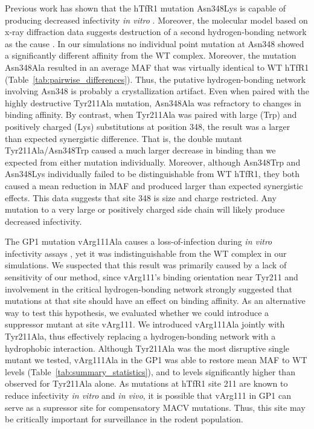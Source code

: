 \documentclass[12pt]{article}
\begin{document}
Previous work has shown that the hTfR1 mutation Asn348Lys is capable of producing decreased infectivity \emph{in vitro} \citep{Rad2008,Rad20111}. Moreover, the molecular model based on x-ray diffraction data suggests destruction of a second hydrogen-bonding network as the cause \citep{Abraham2010}. In our simulations no individual point mutation at Asn348 showed a significantly different affinity from the WT complex. Moreover, the mutation Asn348Ala resulted in an average MAF that was virtually identical to WT hTfR1 (Table~\ref{tab:pairwise_differences}). Thus, the putative hydrogen-bonding network involving Asn348 is probably a crystallization artifact. Even when paired with the highly destructive Tyr211Ala mutation, Asn348Ala was refractory to changes in binding affinity. By contrast, when Tyr211Ala was paired with large (Trp) and positively charged (Lys) substitutions at position 348, the result was a larger than expected synergistic difference. That is, the double mutant Tyr211Ala/Asn348Trp caused a much larger decrease in binding than we expected from either mutation individually. Moreover, although Asn348Trp and Asn348Lys individually failed to be distinguishable from WT hTfR1, they both caused a mean reduction in MAF and produced larger than expected synergistic effects. This data suggests that site 348 is size and charge restricted. Any mutation to a very large or positively charged side chain will likely produce decreased infectivity.

The GP1 mutation vArg111Ala causes a loss-of-infection during \textit{in vitro} infectivity assays \citep{Rad20112}, yet it was indistinguishable from the WT complex in our simulations. We suspected that this result was primarily caused by a lack of sensitivity of our method, since vArg111's binding orientation near Tyr211 and involvement in the critical hydrogen-bonding network strongly suggested that mutations at that site should have an effect on binding affinity. As an alternative way to test this hypothesis, we evaluated whether we could introduce a suppressor mutant at site vArg111. We introduced vArg111Ala jointly with Tyr211Ala, thus effectively replacing a hydrogen-bonding network with a hydrophobic interaction. Although Tyr211Ala was the most disruptive single mutant we tested, vArg111Ala in the GP1 was able to restore mean MAF to WT levels (Table~\ref{tab:summary_statistics}), and to levels significantly higher than observed for Tyr211Ala alone. As mutations at hTfR1 site 211 are known to reduce infectivity \emph{in vitro} and \emph{in vivo}, it is possible that vArg111 in GP1 can serve as a supressor site for compensatory MACV mutations. Thus, this site may be critically important for surveillance in the rodent population.
\end{document}
